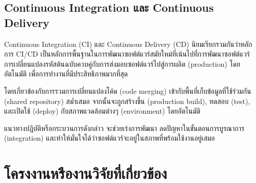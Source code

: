 \documentclass[12pt,oneside,openright,a4paper]{cpe-thai-project}
\begin{document}
    \subsection{Continuous Integration และ Continuous Delivery}
        \begin{flushleft}
        Continuous Integration (CI) และ Continuous Delivery (CD) นิยมเรียกรวมกันว่าหลักการ CI/CD เป็นหลักการพื้นฐานในการพัฒนาซอฟต์แวร์สมัยใหม่ที่เน้นไปที่การพัฒนาซอฟต์แวร์ การเปลี่ยนแปลงรหัสต้นฉบับควบคู่กับการส่งมอบซอฟต์แวร์ไปสู่การผลิต (production) โดยอัตโนมัติ เพื่อการทำงานที่มีประสิทธิภาพมากที่สุด
        \end{flushleft}
        \begin{flushleft}
        โดยเกี่ยวข้องกับการรวมการเปลี่ยนแปลงโค้ด (code merging) เข้ากับพื้นที่เก็บข้อมูลที่ใช้ร่วมกัน (shared repository) สม่ำเสมอ จากนั้นจะถูกสร้างขึ้น (production build), ทดสอบ (test), และเปิดใช้ (deploy) กับสภาพแวดล้อมต่างๆ (environment) โดยอัตโนมัติ~\cite{fowlerCI}
        \end{flushleft}
        \begin{flushleft}
        แนวทางปฏิบัติหรือกระบวนการดังกล่าว จะช่วยเร่งการพัฒนา ลดปัญหาในขั้นตอนการบูรณาการ (integration) และทำให้มั่นใจได้ว่าซอฟต์แวร์จะอยู่ในสภาพที่พร้อมใช้งานอยู่เสมอ
        \end{flushleft}

\section{โครงงานหรืองานวิจัยที่เกี่ยวข้อง}
\end{document}
